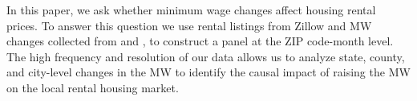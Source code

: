 
In this paper, we ask whether minimum wage changes affect housing rental prices. To answer this 
question we use rental listings from Zillow and MW changes collected from 
\textcite{VaghulZipperer2016} and \textcite{BerkeleyLaborCenter}, to construct a panel 
at the ZIP code-month level. The high frequency and resolution of our data allows us to analyze state, 
county, and city-level changes in the MW to identify the causal impact of raising the MW on the 
local rental housing market. 


